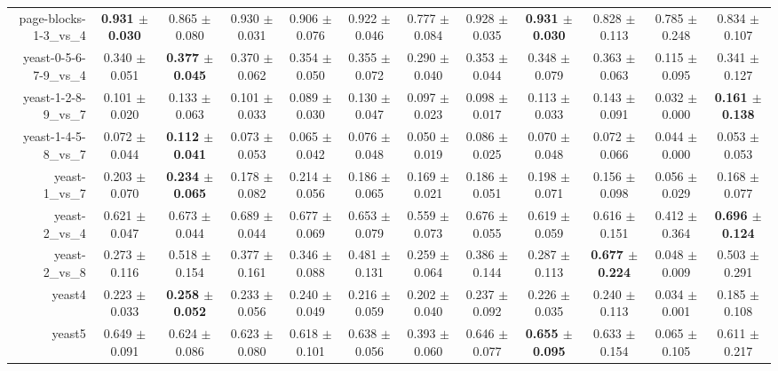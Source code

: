 \begin{table}[!ht]
{\begin{tabular}{r c c c c c c c c c c c}
page-blocks-1-3\_vs\_4 & \textbf{0.931 $\pm$ 0.030} & 0.865 $\pm$ 0.080 & 0.930 $\pm$ 0.031 & 0.906 $\pm$ 0.076 & 0.922 $\pm$ 0.046 & 0.777 $\pm$ 0.084 & 0.928 $\pm$ 0.035 & \textbf{0.931 $\pm$ 0.030} & 0.828 $\pm$ 0.113 & 0.785 $\pm$ 0.248 & 0.834 $\pm$ 0.107 \\
yeast-0-5-6-7-9\_vs\_4 & 0.340 $\pm$ 0.051 & \textbf{0.377 $\pm$ 0.045} & 0.370 $\pm$ 0.062 & 0.354 $\pm$ 0.050 & 0.355 $\pm$ 0.072 & 0.290 $\pm$ 0.040 & 0.353 $\pm$ 0.044 & 0.348 $\pm$ 0.079 & 0.363 $\pm$ 0.063 & 0.115 $\pm$ 0.095 & 0.341 $\pm$ 0.127 \\
yeast-1-2-8-9\_vs\_7 & 0.101 $\pm$ 0.020 & 0.133 $\pm$ 0.063 & 0.101 $\pm$ 0.033 & 0.089 $\pm$ 0.030 & 0.130 $\pm$ 0.047 & 0.097 $\pm$ 0.023 & 0.098 $\pm$ 0.017 & 0.113 $\pm$ 0.033 & 0.143 $\pm$ 0.091 & 0.032 $\pm$ 0.000 & \textbf{0.161 $\pm$ 0.138} \\
yeast-1-4-5-8\_vs\_7 & 0.072 $\pm$ 0.044 & \textbf{0.112 $\pm$ 0.041} & 0.073 $\pm$ 0.053 & 0.065 $\pm$ 0.042 & 0.076 $\pm$ 0.048 & 0.050 $\pm$ 0.019 & 0.086 $\pm$ 0.025 & 0.070 $\pm$ 0.048 & 0.072 $\pm$ 0.066 & 0.044 $\pm$ 0.000 & 0.053 $\pm$ 0.053 \\
yeast-1\_vs\_7 & 0.203 $\pm$ 0.070 & \textbf{0.234 $\pm$ 0.065} & 0.178 $\pm$ 0.082 & 0.214 $\pm$ 0.056 & 0.186 $\pm$ 0.065 & 0.169 $\pm$ 0.021 & 0.186 $\pm$ 0.051 & 0.198 $\pm$ 0.071 & 0.156 $\pm$ 0.098 & 0.056 $\pm$ 0.029 & 0.168 $\pm$ 0.077 \\
yeast-2\_vs\_4 & 0.621 $\pm$ 0.047 & 0.673 $\pm$ 0.044 & 0.689 $\pm$ 0.044 & 0.677 $\pm$ 0.069 & 0.653 $\pm$ 0.079 & 0.559 $\pm$ 0.073 & 0.676 $\pm$ 0.055 & 0.619 $\pm$ 0.059 & 0.616 $\pm$ 0.151 & 0.412 $\pm$ 0.364 & \textbf{0.696 $\pm$ 0.124} \\
yeast-2\_vs\_8 & 0.273 $\pm$ 0.116 & 0.518 $\pm$ 0.154 & 0.377 $\pm$ 0.161 & 0.346 $\pm$ 0.088 & 0.481 $\pm$ 0.131 & 0.259 $\pm$ 0.064 & 0.386 $\pm$ 0.144 & 0.287 $\pm$ 0.113 & \textbf{0.677 $\pm$ 0.224} & 0.048 $\pm$ 0.009 & 0.503 $\pm$ 0.291 \\
yeast4 & 0.223 $\pm$ 0.033 & \textbf{0.258 $\pm$ 0.052} & 0.233 $\pm$ 0.056 & 0.240 $\pm$ 0.049 & 0.216 $\pm$ 0.059 & 0.202 $\pm$ 0.040 & 0.237 $\pm$ 0.092 & 0.226 $\pm$ 0.035 & 0.240 $\pm$ 0.113 & 0.034 $\pm$ 0.001 & 0.185 $\pm$ 0.108 \\
yeast5 & 0.649 $\pm$ 0.091 & 0.624 $\pm$ 0.086 & 0.623 $\pm$ 0.080 & 0.618 $\pm$ 0.101 & 0.638 $\pm$ 0.056 & 0.393 $\pm$ 0.060 & 0.646 $\pm$ 0.077 & \textbf{0.655 $\pm$ 0.095} & 0.633 $\pm$ 0.154 & 0.065 $\pm$ 0.105 & 0.611 $\pm$ 0.217 \\

\end{tabular}}
\end{table}
